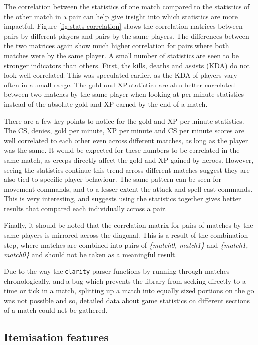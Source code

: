 \documentclass[Report.tex]{subfiles}
\begin{document}
The correlation between the statistics of one match compared to the statistics of the other match in a pair can help give insight into which statistics are more impactful. Figure \ref{fig:stats-correlation} shows the correlation matrices between pairs by different players and pairs by the same players. The differences between the two matrices again show much higher correlation for pairs where both matches were by the same player. A small number of statistics are seen to be stronger indicators than others. First, the kills, deaths and assists (KDA) do not look well correlated. This was speculated earlier, as the KDA of players vary often in a small range. The gold and XP statistics are also better correlated between two matches by the same player when looking at per minute statistics instead of the absolute gold and XP earned by the end of a match. 

There are a few key points to notice for the gold and XP per minute statistics. The CS, denies, gold per minute, XP per minute and CS per minute scores are well correlated to each other even across different matches, as long as the player was the same. It would be expected for these numbers to be correlated in the same match, as creeps directly affect the gold and XP gained by heroes. However, seeing the statistics continue this trend across different matches suggest they are also tied to specific player behaviour. The same pattern can be seen for movement commands, and to a lesser extent the attack and spell cast commands. This is very interesting, and suggests using the statistics together gives better results that compared each individually across a pair. 

Finally, it should be noted that the correlation matrix for pairs of matches by the same players is mirrored across the diagonal. This is a result of the combination step, where matches are combined into pairs of \textit{\{match0, match1\}} and \textit{\{match1, match0\}} and should not be taken as a meaningful result.

Due to the way the \texttt{clarity} parser functions by running through matches chronologically, and a bug which prevents the library from seeking directly to a time or tick in a match, splitting up a match into equally sized portions on the go was not possible and so, detailed data about game statistics on different sections of a match could not be gathered.  

\subsection{Itemisation features}
\end{document}
